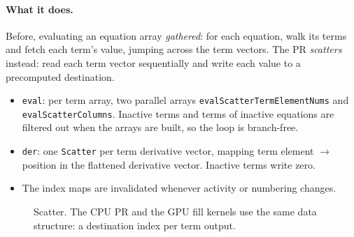 \documentclass[11pt,a4paper]{article}
\newcommand{\code}[1]{\texttt{\small #1}}
\begin{document}
\paragraph{What it does.} Before, evaluating an equation array \emph{gathered}: for each
equation, walk its terms and fetch each term's value, jumping across the term vectors.
The PR \emph{scatters} instead: read each term vector sequentially and write each value
to a precomputed destination.
\begin{itemize}
\item \code{eval}: per term array, two parallel arrays \code{evalScatterTermElementNums}
      and \code{evalScatterColumns}. Inactive terms and terms of inactive equations are
      filtered out when the arrays are built, so the loop is branch-free.
\item \code{der}: one \code{Scatter} per term derivative vector, mapping
      term element $\to$ position in the flattened derivative vector. Inactive terms
      write zero.
\item The index maps are invalidated whenever activity or numbering changes.
\end{itemize}

\begin{figure}[h]
\centering
{}
\caption{Scatter. The CPU PR and the GPU fill kernels use the same data structure: a
destination index per term output.}
\label{fig:scatter}
\end{figure}
\end{document}
